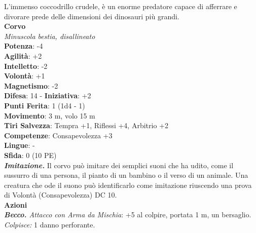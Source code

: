 \begin{multicols}{2}
L’immenso coccodrillo crudele, è un enorme predatore capace di afferrare e divorare prede delle dimensioni dei dinosauri più grandi. \\


\medskip\textbf{Corvo}\\
\emph{Minuscola bestia, disallineato}\\
\textbf{Potenza}: -4\\
\textbf{Agilità}: +2\\
\textbf{Intelletto}: -2\\
\textbf{Volontà}: +1\\
\textbf{Magnetismo}: -2\\
\textbf{Difesa}: 14 - \textbf{Iniziativa}: +2\\
\textbf{Punti Ferita}: 1 (1d4 - 1)\\
\textbf{Movimento}: 3 m, volo 15 m\\
\textbf{Tiri Salvezza}: Tempra +1, Riflessi +4, Arbitrio +2 \\
\textbf{Competenze}: Consapevolezza +3\\
\textbf{Lingue}: -\\
\textbf{Sfida}: 0 (10 PE)\smallskip\\
\emph{\textbf{Imitazione.}} Il corvo può imitare dei semplici suoni che ha udito, come il sussurro di una persona, il pianto di un bambino o il verso di un animale. Una creatura che ode il suono può identificarlo come imitazione riuscendo una prova di Volontà (Consapevolezza) DC 10.\\
\smallskip\textbf{Azioni}\\
\emph{\textbf{Becco.} Attacco con Arma da Mischia}: +5 al colpire, portata 1 m, un bersaglio.\\
\emph{Colpisce:} 1 danno perforante.\\



\end{multicols}
